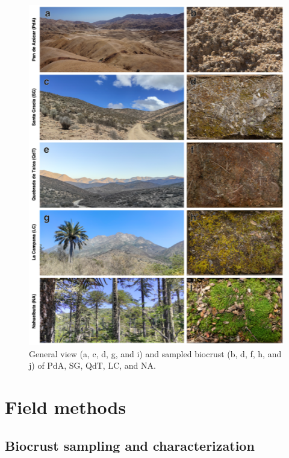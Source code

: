 \begin{figure}[h!]
	\centering
	\includegraphics[width=1\textwidth]{img/location-panel.png}
	\caption{General view (a, c, d, g, and i) and sampled biocrust (b, d, f, h, and j) of PdA, SG, QdT, LC, and NA.}
	\label{fig:location-panel}
\end{figure}

\FloatBarrier

\section{Field methods}
\label{sec:FieldMethods}
\subsection{Biocrust sampling and characterization}

